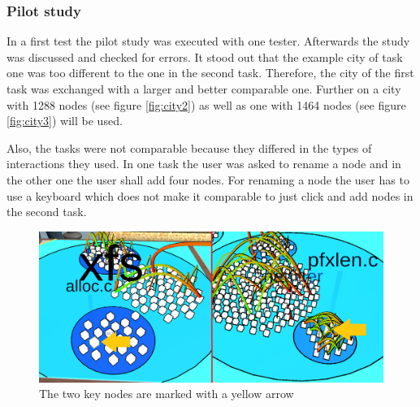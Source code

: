 \subsubsection{Pilot study}
\label{pilot}
In a first test the pilot study was executed with one tester.
Afterwards the study was discussed and checked for errors.
It stood out that the example \gls{city} of task one was too different to the one in the second task.
Therefore, the \gls{city} of the first task was exchanged with a larger and better comparable one.
Further on a \gls{city} with 1288 nodes (see figure \ref{fig:city2}) as well as one with 1464 nodes (see figure \ref{fig:city3}) will be used.

Also, the tasks were not comparable because they differed in the types of interactions they used.
In one task the user was asked to rename a node and in the other one the user shall add four nodes.
For renaming a node the user has to use a keyboard which does not make it comparable to just click and add nodes in the second task.

\begin{figure}[htb]
  \centering
  \includegraphics[width=1\textwidth]{Evaluation/img/task1.png}
  \caption{The two key nodes are marked with a yellow arrow}\label{fig:task1}
\end{figure}

